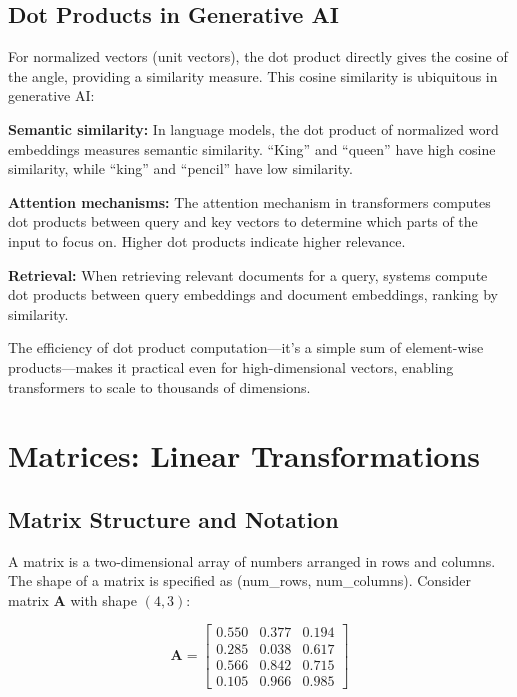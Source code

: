 \documentclass{book}
\begin{document}
\subsection{Dot Products in Generative AI}

For normalized vectors (unit vectors), the dot product directly gives the cosine of the angle, providing a similarity measure. This cosine similarity is ubiquitous in generative AI:

\textbf{Semantic similarity:} In language models, the dot product of normalized word embeddings measures semantic similarity. ``King'' and ``queen'' have high cosine similarity, while ``king'' and ``pencil'' have low similarity.

\textbf{Attention mechanisms:} The attention mechanism in transformers computes dot products between query and key vectors to determine which parts of the input to focus on. Higher dot products indicate higher relevance.

\textbf{Retrieval:} When retrieving relevant documents for a query, systems compute dot products between query embeddings and document embeddings, ranking by similarity.

The efficiency of dot product computation—it's a simple sum of element-wise products—makes it practical even for high-dimensional vectors, enabling transformers to scale to thousands of dimensions.

\section{Matrices: Linear Transformations}

\subsection{Matrix Structure and Notation}

A matrix is a two-dimensional array of numbers arranged in rows and columns. The shape of a matrix is specified as (num\_rows, num\_columns). Consider matrix $\mathbf{A}$ with shape $(4, 3)$:

\begin{equation}
\mathbf{A} = \begin{bmatrix}
0.550 & 0.377 & 0.194 \\
0.285 & 0.038 & 0.617 \\
0.566 & 0.842 & 0.715 \\
0.105 & 0.966 & 0.985
\end{bmatrix}
\end{equation}
\end{document}
